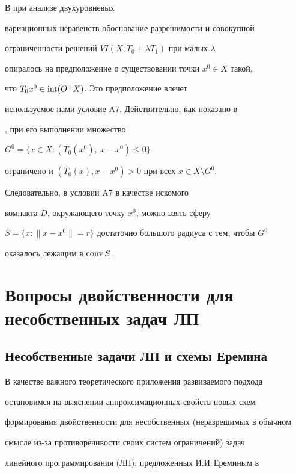 \begin{notenonum} В \cite{9} при анализе двухуровневых


вариационных неравенств обоснование разрешимости и совокупной


ограниченности решений $VI (X,T_0+\lambda T_1)$ при малых $\lambda$


опиралось на предположение о существовании точки $x^0\in X$ такой,


что $T_0x^0\in \operatorname{int} (O^+X)$. Это предположение влечет


используемое нами условие A7. Действительно, как показано в


\cite{9}, при его выполнении множество


$G^0=\{x\in X: (T_0(x^0),\ x-x^0)\le 0\}$


ограничено и $(T_0(x), x-x^0)>0$ при всех $x\in X\setminus G^0$.


Следовательно, в условии A7 в качестве искомого


компакта $D$, окружающего точку $x^0$, можно взять сферу


$S=\{x:\|x-x^0\|=r\}$ достаточно большого радиуса с тем, чтобы $G^0$


оказалось лежащим в $\operatorname{conv} S$.


\end{notenonum}





\section{Вопросы двойственности для несобственных задач ЛП}





\subsection{Несобственные задачи ЛП и схемы Еремина}





В качестве важного теоретического приложения развиваемого подхода


остановимся на выяснении аппроксимационных свойств новых схем


формирования двойственности для несобственных (неразрешимых в обычном


смысле из-за противоречивости своих систем ограничений) задач


линейного программирования (ЛП), предложенных И.И.\,Ереминым в


